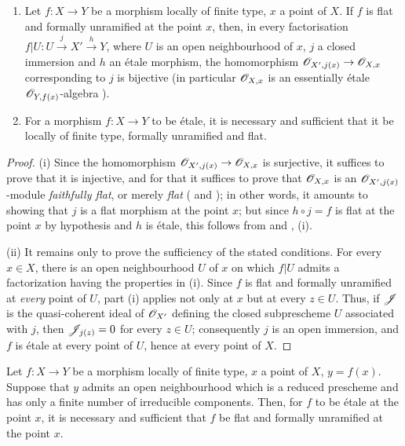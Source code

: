 \begin{corollary}[18.4.12]
\label{IV.18.4.12}
\begin{enumerate}
  \item[(i)] Let $f:X\to Y$ be a morphism locally of finite type, $x$ a point of $X$.
If $f$ is flat and formally unramified at the point $x$, then, in every factorisation $f|U:U\xrightarrow{j}X'\xrightarrow{h}Y$, where $U$ is an open neighbourhood of $x$, $j$ a closed immersion and $h$ an \'etale morphism, the homomorphism $\mathscr{O}_{X',j(x)}\to\mathscr{O}_{X,x}$ corresponding to $j$ is bijective (in particular $\mathscr{O}_{X,x}$ is an essentially \'etale $\mathscr{O}_{Y,f(x)}$-algebra ).
  \item[(ii)] For a morphism $f:X\to Y$ to be \'etale, it is necessary and sufficient that it be locally of finite type, formally unramified and flat.
\end{enumerate}
\end{corollary}

\begin{proof}
(i) Since the homomorphism $\mathscr{O}_{X',j(x)}\to\mathscr{O}_{X,x}$ is surjective, it suffices to prove that it is injective, and for that it suffices to prove that $\mathscr{O}_{X,x}$ is an $\mathscr{O}_{X',j(x)}$-module \emph{faithfully flat}, or merely \emph{flat} ( and );
in other words, it amounts to showing that $j$ is a flat morphism at the point $x$;
but since $h\circ j=f$ is flat at the point $x$ by hypothesis and $h$ is \'etale, this follows from  and , (i).

(ii) It remains only to prove the sufficiency of the stated conditions.
For every $x\in X$, there is an open neighbourhood $U$ of $x$ on which $f|U$ admits a factorization having the properties in (i).
Since $f$ is flat and formally unramified at \emph{every} point of $U$, part (i) applies not only at $x$ but at every $z\in U$.
Thus, if $\mathscr{J}$ is the quasi-coherent ideal of $\mathscr{O}_{X'}$ defining the closed subprescheme $U$ associated with $j$, then $\mathscr{J}_{j(z)}=0$ for every $z\in U$; consequently $j$ is an open immersion, and $f$ is \'etale at every point of $U$, hence at every point of $X$.
\end{proof}

\begin{corollary}[18.4.13]
\label{IV.18.4.13}
Let $f:X\to Y$ be a morphism locally of finite type, $x$ a point of $X$, $y=f(x)$.
Suppose that $y$ admits an open neighbourhood which is a reduced prescheme and has only a finite number of irreducible components.
Then, for $f$ to be \'etale at the point $x$, it is necessary and sufficient that $f$ be flat and formally unramified at the point $x$.
\end{corollary}


